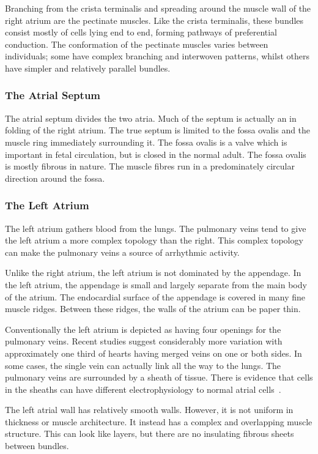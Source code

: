 Branching from the crista terminalis and spreading around the muscle wall of the
right atrium are the pectinate muscles.
Like the crista terminalis, these bundles consist mostly of cells lying end to
end, forming pathways of preferential conduction.
The conformation of the pectinate muscles varies between individuals; some have
complex branching and interwoven patterns, whilst others have simpler and
relatively parallel bundles.

\subsubsection{The Atrial Septum}

The atrial septum divides the two atria.
Much of the septum is actually an in folding of the right atrium.
The true septum is limited to the fossa ovalis and the muscle ring immediately
surrounding it.
The fossa ovalis is a valve which is important in fetal circulation, but is
closed in the normal adult.
The fossa ovalis is mostly fibrous in nature.
The muscle fibres run in a predominately circular direction around the fossa.

\subsubsection{The Left Atrium}

The left atrium gathers blood from the lungs.
The pulmonary veins tend to give the left atrium a more complex topology than
the right.
This complex topology can make the pulmonary veins a source of arrhythmic
activity.

Unlike the right atrium, the left atrium is not dominated by the appendage.
In the left atrium, the appendage is small and largely separate from the main
body of the atrium.
The endocardial surface of the appendage is covered in many fine muscle ridges.
Between these ridges, the walls of the atrium can be paper thin.

Conventionally the left atrium is depicted as having four openings for the
pulmonary veins.
Recent studies suggest considerably more variation with approximately one third
of hearts having merged veins on one or both sides.
In some cases, the single vein can actually link all the way to the lungs.
The pulmonary veins are surrounded by a sheath of tissue.
There is evidence that cells in the sheaths can have different electrophysiology
to normal atrial cells~\cite{Jones2008}.

The left atrial wall has relatively smooth walls.
However, it is not uniform in thickness or muscle architecture.
It instead has a complex and overlapping muscle structure.
This can look like layers, but there are no insulating fibrous sheets between
bundles.

